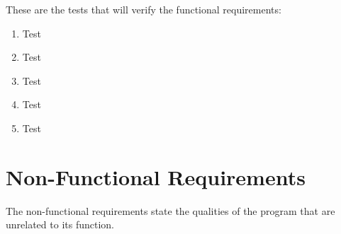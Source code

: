 \documentclass{article}
\begin{document}
These are the tests that will verify the functional requirements:

\begin{enumerate}
  \item Test
  \item Test
  \item Test
  \item Test
  \item Test
\end{enumerate}

\section{Non-Functional Requirements}

The non-functional requirements state the qualities of the program that are unrelated to its function.
\end{document}
